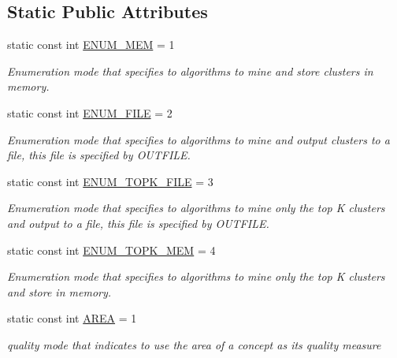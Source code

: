 \subsection*{Static Public Attributes}
\begin{DoxyCompactItemize}
\item 
static const int \hyperlink{class_lattice_algos_a80df6360d3246d74ae31e51e6c4bfa0e}{ENUM\_\-MEM} = 1
\begin{DoxyCompactList}\small\item\em Enumeration mode that specifies to algorithms to mine and store clusters in memory. \item\end{DoxyCompactList}\item 
static const int \hyperlink{class_lattice_algos_a824804a33640782553f2b399b28fde13}{ENUM\_\-FILE} = 2
\begin{DoxyCompactList}\small\item\em Enumeration mode that specifies to algorithms to mine and output clusters to a file, this file is specified by OUTFILE. \item\end{DoxyCompactList}\item 
static const int \hyperlink{class_lattice_algos_a04a0ea3a71c5b598242fa4ec3d4fce79}{ENUM\_\-TOPK\_\-FILE} = 3
\begin{DoxyCompactList}\small\item\em Enumeration mode that specifies to algorithms to mine only the top K clusters and output to a file, this file is specified by OUTFILE. \item\end{DoxyCompactList}\item 
static const int \hyperlink{class_lattice_algos_a1c6a4b5dce3ccade9e17ce4b2a6afbe7}{ENUM\_\-TOPK\_\-MEM} = 4
\begin{DoxyCompactList}\small\item\em Enumeration mode that specifies to algorithms to mine only the top K clusters and store in memory. \item\end{DoxyCompactList}\item 
static const int \hyperlink{class_lattice_algos_a0a79ddaab00906dea5756ac05a4861a5}{AREA} = 1
\begin{DoxyCompactList}\small\item\em quality mode that indicates to use the area of a concept as its quality measure \item\end{DoxyCompactList}\item 

\end{DoxyCompactItemize}

